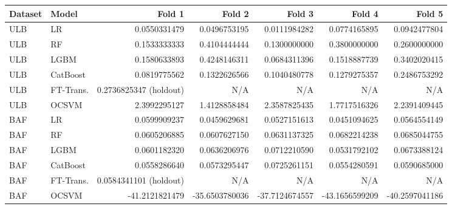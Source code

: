 \begin{tabular}{@{}l l r r r r r@{}}
\toprule
Dataset & Model & Fold 1 & Fold 2 & Fold 3 & Fold 4 & Fold 5 \\
\midrule
ULB & LR & 0.0550331479 & 0.0496753195 & 0.0111984282 & 0.0774165895 & 0.0942477804 \\
ULB & RF & 0.1533333333 & 0.4104444444 & 0.1300000000 & 0.3800000000 & 0.2600000000 \\
ULB & LGBM & 0.1580633893 & 0.4248146311 & 0.0684311396 & 0.1518887739 & 0.3402020415 \\
ULB & CatBoost & 0.0819775562 & 0.1322626566 & 0.1040480778 & 0.1279275357 & 0.2486753292 \\
ULB & FT-Trans. & 0.2736825347 (holdout) & N/A & N/A & N/A & N/A \\
ULB & OCSVM & 2.3992295127 & 1.4128858484 & 2.3587825435 & 1.7717516326 & 2.2391409445 \\
BAF & LR & 0.0599909237 & 0.0459629681 & 0.0527151613 & 0.0451094625 & 0.0564554149 \\
BAF & RF & 0.0605206885 & 0.0607627150 & 0.0631137325 & 0.0682214238 & 0.0685044755 \\
BAF & LGBM & 0.0601182320 & 0.0636206976 & 0.0712210590 & 0.0531792102 & 0.0673388124 \\
BAF & CatBoost & 0.0558286640 & 0.0573295447 & 0.0725261151 & 0.0554280591 & 0.0590685000 \\
BAF & FT-Trans. & 0.0584341101 (holdout) & N/A & N/A & N/A & N/A \\
BAF & OCSVM & -41.2121821479 & -35.6503780036 & -37.7124674557 & -43.1656599209 & -40.2597041186 \\
\bottomrule
\end{tabular}
